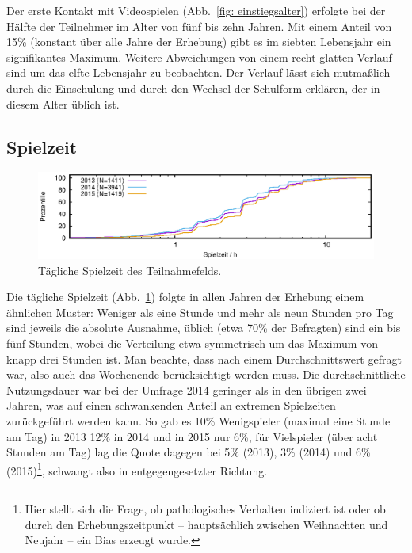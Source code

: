 \documentclass[11pt]{scrartcl}
\begin{document}
Der erste Kontakt mit Videospielen (Abb.~\ref{fig: einstiegsalter})
erfolgte bei der Hälfte der Teilnehmer im Alter von fünf bis zehn Jahren.
Mit einem Anteil von 15\% (konstant über alle Jahre der Erhebung)
gibt es im siebten Lebensjahr ein signifikantes Maximum.
Weitere Abweichungen von einem recht glatten Verlauf sind um das elfte
Lebensjahr zu beobachten.
Der Verlauf lässt sich mutmaßlich durch die Einschulung und durch den
Wechsel der Schulform erklären, der in diesem Alter üblich ist.



\subsection{Spielzeit}

\begin{figure}[htb]
	\centering
	\includegraphics[width=15cm]{vgl/spielzeit}
	\caption[Spielzeit]
	{Tägliche Spielzeit des Teilnahmefelds.}
	\label{fig: spielzeit}
\end{figure}

Die tägliche Spielzeit (Abb.~\ref{fig: spielzeit})
folgte in allen Jahren der Erhebung einem ähnlichen Muster:
Weniger als eine Stunde und mehr als neun Stunden pro Tag
sind jeweils die absolute Ausnahme,
üblich (etwa 70\% der Befragten) sind ein bis fünf Stunden,
wobei die Verteilung etwa symmetrisch um das Maximum von knapp drei
Stunden ist.
Man beachte, dass nach einem Durchschnittswert gefragt war,
also auch das Wochenende berücksichtigt werden muss.
Die durchschnittliche Nutzungsdauer war bei der Umfrage 2014 geringer
als in den übrigen zwei Jahren,
was auf einen schwankenden Anteil an extremen Spielzeiten
zurückgeführt werden kann.
So gab es 10\% Wenigspieler (maximal eine Stunde am Tag) in 2013
12\% in 2014 und in 2015 nur 6\%,
für Vielspieler (über acht Stunden am Tag) lag die Quote dagegen bei
5\% (2013), 3\% (2014) und 6\% (2015)\footnote{Hier stellt sich die Frage,
ob pathologisches Verhalten indiziert ist oder ob durch den Erhebungszeitpunkt
-- hauptsächlich zwischen Weihnachten und Neujahr -- ein Bias erzeugt wurde.},
schwangt also in entgegengesetzter Richtung.
\end{document}
